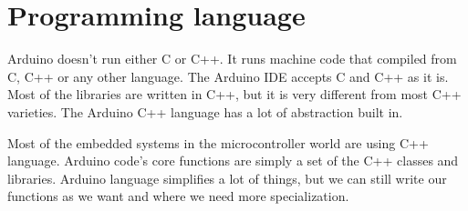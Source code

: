 	\section{Programming language}
		\hspace{15pt}Arduino doesn't run either C or C++. It runs machine code that compiled from C, C++ or any other language. The Arduino IDE accepts C and C++ as it is. Most of the libraries are written in C++, but it is very different from most C++ varieties. The Arduino C++ language has a lot of abstraction built in.
		
		
		Most of the embedded systems in the microcontroller world are using C++ language. Arduino code's core functions are simply a set of the C++ classes and libraries. Arduino language simplifies a lot of things, but we can still write our functions as we want and where we need more specialization. 